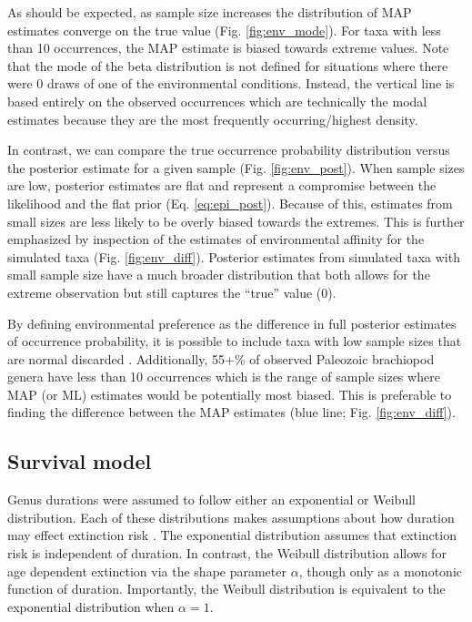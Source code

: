 \documentclass[12pt,letterpaper]{article}
\begin{document}
As should be expected, as sample size increases the distribution of MAP estimates converge on the true value (Fig. \ref{fig:env_mode}). For taxa with less than 10 occurrences, the MAP estimate is biased towards extreme values. Note that the mode of the beta distribution is not defined for situations where there were 0 draws of one of the environmental conditions. Instead, the vertical line is based entirely on the observed occurrences which are technically the modal estimates because they are the most frequently occurring/highest density.

In contrast, we can compare the true occurrence probability distribution versus the posterior estimate for a given sample (Fig. \ref{fig:env_post}). When sample sizes are low, posterior estimates are flat and represent a compromise between the likelihood and the flat prior (Eq. \ref{eq:epi_post}). Because of this, estimates from small sizes are less likely to be overly biased towards the extremes. This is further emphasized by inspection of the estimates of environmental affinity for the simulated taxa (Fig. \ref{fig:env_diff}). Posterior estimates from simulated taxa with small sample size have a much broader distribution that both allows for the extreme observation but still captures the ``true'' value (0). 


By defining environmental preference as the difference in full posterior estimates of occurrence probability, it is possible to include taxa with low sample sizes that are normal discarded \citep{Foote2006,Miller2001,Simpson2009,Kiessling2007a}. Additionally, 55+\% of observed Paleozoic brachiopod genera have less than 10 occurrences which is the range of sample sizes where MAP (or ML) estimates would be potentially most biased. This is preferable to finding the difference between the MAP estimates (blue line; Fig. \ref{fig:env_diff}).


\subsection{Survival model}

Genus durations were assumed to follow either an exponential or Weibull distribution. Each of these distributions makes assumptions about how duration may effect extinction risk \citep{Klein2003}. The exponential distribution assumes that extinction risk is independent of duration. In contrast, the Weibull distribution allows for age dependent extinction via the shape parameter \(\alpha\), though only as a monotonic function of duration. Importantly, the Weibull distribution is equivalent to the exponential distribution when \(\alpha = 1\). %
\end{document}
